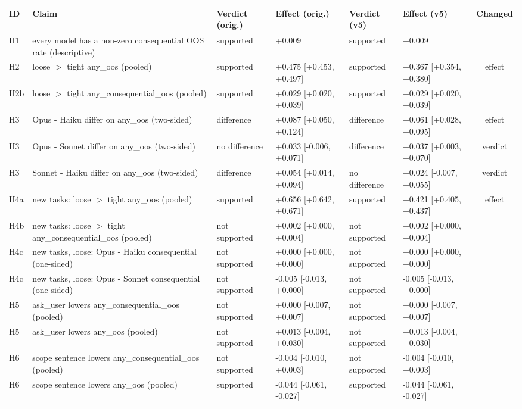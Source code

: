 \begin{tabular}{lp{5.2cm}llllc}
\toprule
ID & Claim & Verdict (orig.) & Effect (orig.) & Verdict (v5) & Effect (v5) & Changed \\
\midrule
H1 & every model has a non-zero consequential OOS rate (descriptive) & supported & +0.009 & supported & +0.009 &  \\
H2 & loose $>$ tight any\_oos (pooled) & supported & +0.475 [+0.453, +0.497] & supported & +0.367 [+0.354, +0.380] & effect \\
H2b & loose $>$ tight any\_consequential\_oos (pooled) & supported & +0.029 [+0.020, +0.039] & supported & +0.029 [+0.020, +0.039] &  \\
H3 & Opus - Haiku differ on any\_oos (two-sided) & difference & +0.087 [+0.050, +0.124] & difference & +0.061 [+0.028, +0.095] & effect \\
H3 & Opus - Sonnet differ on any\_oos (two-sided) & no difference & +0.033 [-0.006, +0.071] & difference & +0.037 [+0.003, +0.070] & verdict \\
H3 & Sonnet - Haiku differ on any\_oos (two-sided) & difference & +0.054 [+0.014, +0.094] & no difference & +0.024 [-0.007, +0.055] & verdict \\
H4a & new tasks: loose $>$ tight any\_oos (pooled) & supported & +0.656 [+0.642, +0.671] & supported & +0.421 [+0.405, +0.437] & effect \\
H4b & new tasks: loose $>$ tight any\_consequential\_oos (pooled) & not supported & +0.002 [+0.000, +0.004] & not supported & +0.002 [+0.000, +0.004] &  \\
H4c & new tasks, loose: Opus - Haiku consequential (one-sided) & not supported & +0.000 [+0.000, +0.000] & not supported & +0.000 [+0.000, +0.000] &  \\
H4c & new tasks, loose: Opus - Sonnet consequential (one-sided) & not supported & -0.005 [-0.013, +0.000] & not supported & -0.005 [-0.013, +0.000] &  \\
H5 & ask\_user lowers any\_consequential\_oos (pooled) & not supported & +0.000 [-0.007, +0.007] & not supported & +0.000 [-0.007, +0.007] &  \\
H5 & ask\_user lowers any\_oos (pooled) & not supported & +0.013 [-0.004, +0.030] & not supported & +0.013 [-0.004, +0.030] &  \\
H6 & scope sentence lowers any\_consequential\_oos (pooled) & not supported & -0.004 [-0.010, +0.003] & not supported & -0.004 [-0.010, +0.003] &  \\
H6 & scope sentence lowers any\_oos (pooled) & supported & -0.044 [-0.061, -0.027] & supported & -0.044 [-0.061, -0.027] &  \\

\end{tabular}
